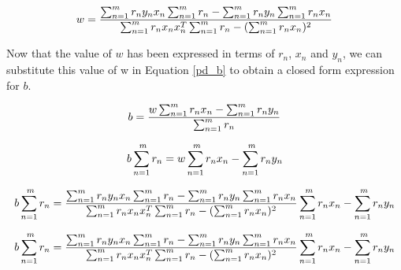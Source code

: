 \documentclass[a4paper]{article}
\begin{document}
\begin{equation}
\label{cf_w}
w  = \frac{\sum_{n=1}^{\\m} r_n y_n x_n \sum_{n=1}^{\\m} r_n - \sum_{n=1}^{\\m} r_n y_n \sum_{n=1}^{\\m} r_n x_n}{\sum_{n=1}^{\\m}r_n x_n x_n^T \sum_{n=1}^{\\m} r_n - ({\sum_{n=1}^{\\m}r_n x_n})^2}
\end{equation}

\vspace{10mm}

Now that the value of $w$ has been expressed in terms of $r_n$, $x_n$ and $y_n$, we can substitute this value of w in Equation \ref{pd_b} to obtain a closed form expression for $b$.

$$b = \frac{w \sum_{n=1}^{\\m}r_n x_n - \sum_{n=1}^{\\m} r_n y_n}{\sum_{n=1}^{\\m} r_n} $$

$$b \sum_{n=1}^{\\m} r_n = w \sum_{n=1}^{\\m}r_n x_n - \sum_{n=1}^{\\m} r_n y_n$$

$$b \sum_{n=1}^{\\m} r_n = \frac{\sum_{n=1}^{\\m} r_n y_n x_n \sum_{n=1}^{\\m} r_n - \sum_{n=1}^{\\m} r_n y_n \sum_{n=1}^{\\m} r_n x_n}{\sum_{n=1}^{\\m}r_n x_n x_n^T \sum_{n=1}^{\\m} r_n - ({\sum_{n=1}^{\\m}r_n x_n})^2} \sum_{n=1}^{\\m}r_n x_n - \sum_{n=1}^{\\m} r_n y_n$$

$$b \sum_{n=1}^{\\m} r_n = \frac{\sum_{n=1}^{\\m} r_n y_n x_n \sum_{n=1}^{\\m} r_n - \sum_{n=1}^{\\m} r_n y_n \sum_{n=1}^{\\m} r_n x_n}{\sum_{n=1}^{\\m}r_n x_n x_n^T \sum_{n=1}^{\\m} r_n - ({\sum_{n=1}^{\\m}r_n x_n})^2} \sum_{n=1}^{\\m}r_n x_n - \sum_{n=1}^{\\m} r_n y_n$$
\end{document}
